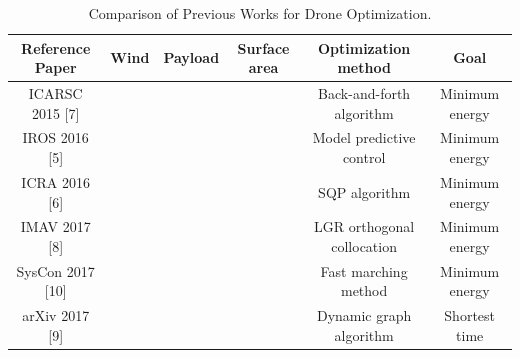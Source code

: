 \documentclass[journal]{./template/IEEEtran}
\newcommand{\cmark}{\ding{51}}%
\newcommand{\xmark}{\ding{55}}%
\begin{document}
\begin{table}[ht]
\caption{Comparison of Previous Works for Drone Optimization.}
\label{Table: survay_result}
\centering
\begin{tabular}{|c|c|c|c|c|c|}
\hline
Reference Paper & Wind & Payload & Surface area & Optimization method & Goal \\ \hline
ICARSC 2015 {[}7{]} & %
& %
& %
& Back-and-forth algorithm & Minimum energy \\ \hline
IROS 2016 {[}5{]} & \cmark & %
& %
& Model predictive control & Minimum energy \\ \hline
ICRA 2016 {[}6{]} & %
& \cmark & %
& SQP algorithm & Minimum energy \\ \hline
IMAV 2017 {[}8{]} & %
& \cmark & \cmark & LGR orthogonal collocation & Minimum energy \\ \hline
SysCon 2017 {[}10{]} & \cmark & %
& %
& Fast marching method & Minimum energy \\ \hline
arXiv 2017 {[}9{]} & \cmark & \cmark & %
& Dynamic graph algorithm &Shortest time \\ \hline
\end{tabular}
\end{table}
\end{document}
